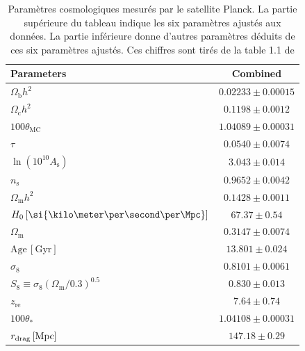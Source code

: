 \begin{table}[h]
  \centering
  \caption{Paramètres cosmologiques mesurés par le satellite Planck. La partie supérieure du tableau indique les six paramètres ajustés aux données. La partie inférieure donne d'autres paramètres déduits de ces six paramètres ajustés. Ces chiffres sont tirés de la table 1.1 de \textcite{Collaboration2018}}
  \label{table:planck2018}
  \begin{tabular}{lc}
    \toprule
    Parameters & Combined \\
    \midrule
    $\Omega_{\mathrm{b}}h^2$\dotfill & $0.02233\pm0.00015$ \\
    $\Omega_{\mathrm{c}}h^2$\dotfill & $0.1198\pm0.0012$ \\
    $100\theta_{\mathrm{MC}}$\dotfill & $1.04089\pm0.00031$ \\
    $\tau$\dotfill & $0.0540\pm0.0074$ \\
    $\ln(10^{10}A_\mathrm{s})$\dotfill & $3.043\pm0.014$ \\
    $n_\mathrm{s}$\dotfill & $0.9652\pm0.0042$ \\
    \midrule
    $\Omega_{\mathrm{m}} h^2$\dotfill & $ 0.1428\pm 0.0011 $ \\
    $H_0 \,[\si{\kilo\meter\per\second\per\Mpc}]$\dotfill & $67.37\pm0.54$ \\
    $\Omega_{\mathrm{m}}$\dotfill & $0.3147\pm0.0074$ \\
    $\mathrm{Age}\, [\mathrm{Gyr}]$\dotfill  & $13.801\pm0.024$ \\
    $\sigma_8$\dotfill & $0.8101\pm0.0061$ \\
    $S_8\equiv \sigma_8 (\Omega_{\mathrm{m}}/0.3)^{0.5}$\dotfill & $0.830\pm0.013$ \\
    $z_{\mathrm{re}}$\dotfill & $7.64\pm0.74$ \\
    $100\theta_\ast$\dotfill & $1.04108\pm0.00031$ \\
    $r_{\mathrm{drag}} \,[{\rm Mpc}]$\dotfill & $147.18\pm0.29$ \\
    \bottomrule
  \end{tabular}
\end{table}

